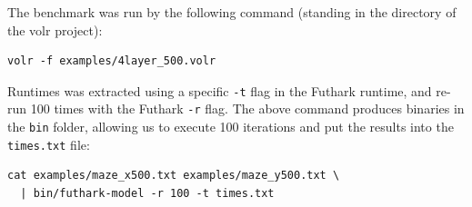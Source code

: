 \documentclass[a4paper,oneside]{memoir}
\begin{document}
The benchmark was run by the following command (standing in the directory of
the volr project):
\begin{verbatim}
volr -f examples/4layer_500.volr
\end{verbatim}

Runtimes was extracted using a specific \texttt{-t} flag in the Futhark
runtime, and re-run 100 times with the Futhark \texttt{-r} flag. The above
command produces binaries in the \texttt{bin} folder, allowing us to execute
100 iterations and put the results into the \texttt{times.txt} file:
\begin{verbatim}
cat examples/maze_x500.txt examples/maze_y500.txt \
  | bin/futhark-model -r 100 -t times.txt
\end{verbatim}

\printbibliography
\end{document}

